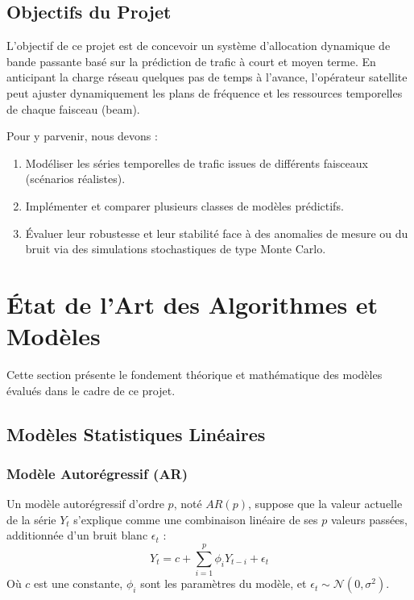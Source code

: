 \documentclass[11pt,a4paper]{article}
\begin{document}
\subsection{Objectifs du Projet}
L'objectif de ce projet est de concevoir un système d'allocation dynamique de bande passante basé sur la prédiction de trafic à court et moyen terme. En anticipant la charge réseau quelques pas de temps à l'avance, l'opérateur satellite peut ajuster dynamiquement les plans de fréquence et les ressources temporelles de chaque faisceau (beam). 

Pour y parvenir, nous devons :
\begin{enumerate}
    \item Modéliser les séries temporelles de trafic issues de différents faisceaux (scénarios réalistes).
    \item Implémenter et comparer plusieurs classes de modèles prédictifs.
    \item Évaluer leur robustesse et leur stabilité face à des anomalies de mesure ou du bruit via des simulations stochastiques de type Monte Carlo.
\end{enumerate}

\section{État de l'Art des Algorithmes et Modèles}
\label{sec:etat_art}
Cette section présente le fondement théorique et mathématique des modèles évalués dans le cadre de ce projet.

\subsection{Modèles Statistiques Linéaires}
\subsubsection{Modèle Autorégressif (AR)}
Un modèle autorégressif d'ordre $p$, noté $AR(p)$, suppose que la valeur actuelle de la série $Y_t$ s'explique comme une combinaison linéaire de ses $p$ valeurs passées, additionnée d'un bruit blanc $\epsilon_t$ :
\begin{equation}
    Y_t = c + \sum_{i=1}^{p} \phi_i Y_{t-i} + \epsilon_t
\end{equation}
Où $c$ est une constante, $\phi_i$ sont les paramètres du modèle, et $\epsilon_t \sim \mathcal{N}(0, \sigma^2)$.
\end{document}
